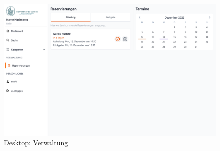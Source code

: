 \begin{figure}[p]
    \centering
    \includegraphics[scale=0.25]{Bilder/Dialgobeispiel/Verwaltung.png}
    \caption[Dialogbeispiel 3]{Desktop: Verwaltung}\label{fig:georg}
\end{figure}
